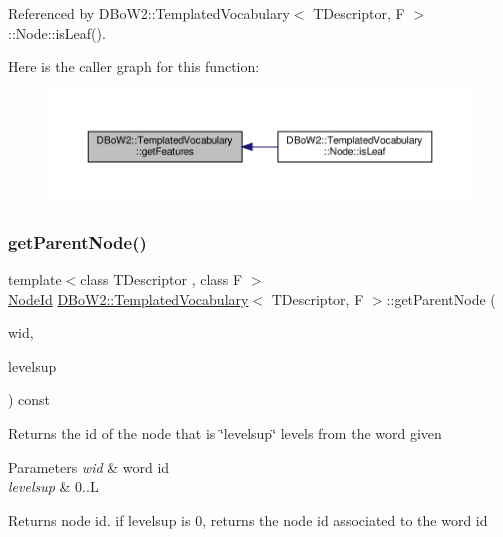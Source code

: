 Referenced by D\+Bo\+W2\+::\+Templated\+Vocabulary$<$ T\+Descriptor, F $>$\+::\+Node\+::is\+Leaf().

Here is the caller graph for this function\+:\nopagebreak
\begin{figure}[H]
\begin{center}
\leavevmode
\includegraphics[width=350pt]{classDBoW2_1_1TemplatedVocabulary_ae2f4fabe99ff93a9d72b4416722f1a78_icgraph}
\end{center}
\end{figure}
\mbox{\label{classDBoW2_1_1TemplatedVocabulary_a03912634600711fbf70355ed32b07f2c}} 
\subsubsection{\texorpdfstring{get\+Parent\+Node()}{getParentNode()}}
{\footnotesize\ttfamily template$<$class T\+Descriptor , class F $>$ \\
\hyperlink{namespaceDBoW2_a3a0fa9c50c0df508759362d6204566f2}{Node\+Id} \hyperlink{classDBoW2_1_1TemplatedVocabulary}{D\+Bo\+W2\+::\+Templated\+Vocabulary}$<$ T\+Descriptor, F $>$\+::get\+Parent\+Node (\begin{DoxyParamCaption}\item[{\hyperlink{namespaceDBoW2_ab1a0d3283b2d4690a383372ed20bfeb5}{Word\+Id}}]{wid,  }\item[{int}]{levelsup }\end{DoxyParamCaption}) const\hspace{0.3cm}{\ttfamily [virtual]}}

Returns the id of the node that is \char`\"{}levelsup\char`\"{} levels from the word given 
\begin{DoxyParams}{Parameters}
{\em wid} & word id \\
\hline
{\em levelsup} & 0..L \\
\hline
\end{DoxyParams}
\begin{DoxyReturn}{Returns}
node id. if levelsup is 0, returns the node id associated to the word id 
\end{DoxyReturn}
\mbox{\label{classDBoW2_1_1TemplatedVocabulary_ad830e1e3e547e5d9d45971662afca3d5}} 
